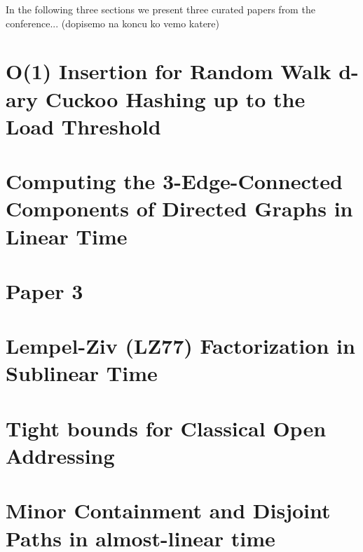 \documentclass[
	a4paper, %
	10pt, %
	unnumberedsections, %
	twoside, %
]{LTJournalArticle}
\theoremstyle{remark}
\begin{document}
In the following three sections we present three curated papers from the conference... (dopisemo na koncu ko vemo katere)


\section{O(1) Insertion for Random Walk d-ary Cuckoo Hashing up to the Load Threshold}



\section{Computing the 3-Edge-Connected Components of Directed Graphs in Linear Time}




\section{Paper 3}



\section{Lempel-Ziv (LZ77) Factorization in Sublinear Time}



\section{Tight bounds for Classical Open Addressing}



\section{Minor Containment and Disjoint Paths in almost-linear time}




\printbibliography %

\end{document}
